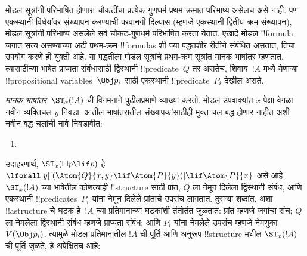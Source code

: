 \documentclass[../../../include/open-logic-section]{subfiles}
\begin{document}


मोडल सूत्रांनी परिभाषित होणारा चौकटींचा प्रत्येक गुणधर्म
प्रथम-क्रमात परिभाष्य असेलच असे नाही. पण एकस्थानी
विधेयांवर संख्यापन करण्याची परवानगी दिल्यास (म्हणजे
एकस्थानी द्वितीय-क्रम संख्यापन), मोडल सूत्रांनी परिभाष्य
असलेले सर्व चौकट-गुणधर्म परिभाषित करता येतात.
एखादे मोडल !!{formula} जगात सत्य असण्याच्या अटी
प्रथम-क्रम !!{formula}s शी ज्या पद्धतशीर रीतीने
संबंधित असतात, तिचा उपयोग करणे ही युक्ती आहे.
या पद्धतीला मोडल सूत्रांचे प्रथम-क्रम सूत्रांत
मानक भाषांतर म्हणतात. त्यासाठीच्या भाषेत
प्राप्यता संबंधासाठी द्विस्थानी !!{predicate}~$Q$
तर असतेच, शिवाय~$!A$ मध्ये येणाऱ्या
!!{propositional variable}s~$\Obj p_i$ साठी
एकस्थानी !!{predicate}~$P_i$ देखील असते.

\begin{defn}
  \emph{मानक भाषांतर}~$\ST_x(!A)$ ची विगमनाने
  पुढीलप्रमाणे व्याख्या करतो. मोडल उपवाक्यांत $x$ पेक्षा वेगळा
  नवीन व्यक्तिचल $y$ निवडा. आतील भाषांतरातील संख्यापकांसाठीही
  मुक्त चल बद्ध होणार नाहीत अशी नवीन बद्ध चलांची नावे निवडावीत:
  \begin{enumerate}
  \item {}
  \end{enumerate}
\end{defn}

उदाहरणार्थ, $\ST_x(\Box p \lif p)$ हे
$\lforall[y][(\Atom{Q}{x,y}
  \lif \Atom{P}{y})] \lif \Atom{P}{x}$ असे आहे.
~$\ST_x(!A)$ च्या भाषेतील कोणत्याही !!{structure}
साठी प्रांत, $Q$ ला नेमून दिलेला द्विस्थानी संबंध,
आणि एकस्थानी !!{predicate}s~$P_i$ यांना नेमून
दिलेले प्रांताचे उपसंच लागतात. दुसऱ्या शब्दांत,
अशा !!a{structure} चे घटक हे~$!A$ च्या प्रतिमानाच्या
घटकांशी तंतोतंत जुळतात: प्रांत म्हणजे जगांचा संच;
$Q$ ला नेमलेला द्विस्थानी संबंध म्हणजे प्राप्यता
संबंध; आणि $P_i$ यांना नेमलेले उपसंच म्हणजे
नेमणुका~$V(\Obj p_i)$. त्यामुळे मोडल प्रतिमानातील
$!A$ ची पूर्ति आणि अनुरूप !!{structure} मधील
$\ST_x(!A)$ ची पूर्ति जुळते, हे अपेक्षितच आहे:
\end{document}
